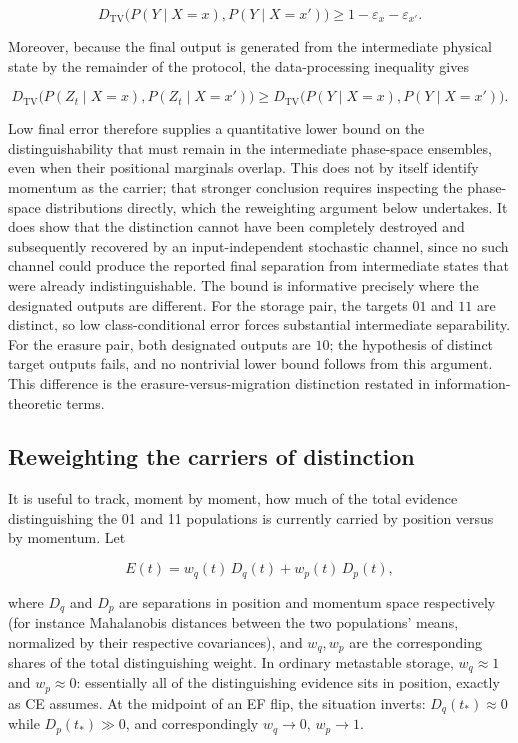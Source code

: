 \documentclass[11pt]{article}
\begin{document}
\[
D_{\mathrm{TV}}\bigl(P(Y\mid X=x),P(Y\mid X=x')\bigr) \ge 1-\varepsilon_x-\varepsilon_{x'}.
\]

Moreover, because the final output is generated from the intermediate physical state by the remainder of the protocol, the data-processing inequality gives

\[
D_{\mathrm{TV}}\bigl(P(Z_t\mid X=x),P(Z_t\mid X=x')\bigr) \ge D_{\mathrm{TV}}\bigl(P(Y\mid X=x),P(Y\mid X=x')\bigr).
\]

Low final error therefore supplies a quantitative lower bound on the distinguishability that must remain in the intermediate phase-space ensembles, even when their positional marginals overlap. This does not by itself identify momentum as the carrier; that stronger conclusion requires inspecting the phase-space distributions directly, which the reweighting argument below undertakes. It does show that the distinction cannot have been completely destroyed and subsequently recovered by an input-independent stochastic channel, since no such channel could produce the reported final separation from intermediate states that were already indistinguishable. The bound is informative precisely where the designated outputs are different. For the storage pair, the targets $01$ and $11$ are distinct, so low class-conditional error forces substantial intermediate separability. For the erasure pair, both designated outputs are $10$; the hypothesis of distinct target outputs fails, and no nontrivial lower bound follows from this argument. This difference is the erasure-versus-migration distinction restated in information-theoretic terms.

\subsection{Reweighting the carriers of distinction}

It is useful to track, moment by moment, how much of the total evidence distinguishing the 01 and 11 populations is currently carried by position versus by momentum. Let

\[
E(t) = w_q(t)\,D_q(t) + w_p(t)\,D_p(t),
\]

where $D_q$ and $D_p$ are separations in position and momentum space respectively (for instance Mahalanobis distances between the two populations' means, normalized by their respective covariances), and $w_q,w_p$ are the corresponding shares of the total distinguishing weight. In ordinary metastable storage, $w_q\approx1$ and $w_p\approx0$: essentially all of the distinguishing evidence sits in position, exactly as CE assumes. At the midpoint of an EF flip, the situation inverts: $D_q(t_\ast)\approx0$ while $D_p(t_\ast)\gg0$, and correspondingly $w_q\to0$, $w_p\to1$.
\end{document}
